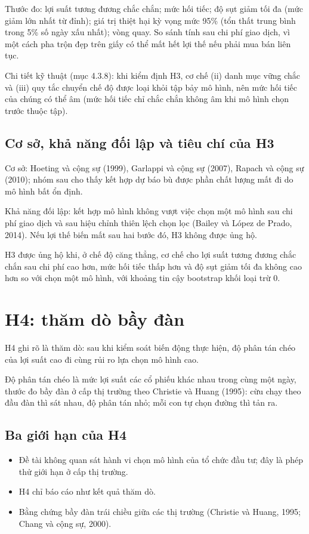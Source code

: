 Thước đo: lợi suất tương đương chắc chắn; mức hối tiếc; độ sụt giảm tối đa (mức giảm lớn nhất từ đỉnh); giá trị thiệt hại kỳ vọng mức 95\% (tổn thất trung bình trong 5\% số ngày xấu nhất); vòng quay. So sánh tính sau chi phí giao dịch, vì một cách pha trộn đẹp trên giấy có thể mất hết lợi thế nếu phải mua bán liên tục.

Chi tiết kỹ thuật (mục 4.3.8): khi kiểm định H3, cơ chế (ii) danh mục vững chắc và (iii) quy tắc chuyển chế độ được loại khỏi tập bảy mô hình, nên mức hối tiếc của chúng có thể âm (mức hối tiếc chỉ chắc chắn không âm khi mô hình chọn trước thuộc tập).

\subsection{Cơ sở, khả năng đối lập và tiêu chí của H3}

Cơ sở: Hoeting và cộng sự (1999), Garlappi và cộng sự (2007), Rapach và cộng sự (2010); nhóm sau cho thấy kết hợp dự báo bù được phần chất lượng mất đi do mô hình bất ổn định.

Khả năng đối lập: kết hợp mô hình không vượt việc chọn một mô hình sau chi phí giao dịch và sau hiệu chỉnh thiên lệch chọn lọc (Bailey và López de Prado, 2014). Nếu lợi thế biến mất sau hai bước đó, H3 không được ủng hộ.

H3 được ủng hộ khi, ở chế độ căng thẳng, cơ chế cho lợi suất tương đương chắc chắn sau chi phí cao hơn, mức hối tiếc thấp hơn và độ sụt giảm tối đa không cao hơn so với chọn một mô hình, với khoảng tin cậy bootstrap khối loại trừ 0.

\section{H4: thăm dò bầy đàn}

H4 ghi rõ là thăm dò: sau khi kiểm soát biến động thực hiện, độ phân tán chéo của lợi suất cao đi cùng rủi ro lựa chọn mô hình cao.

Độ phân tán chéo là mức lợi suất các cổ phiếu khác nhau trong cùng một ngày, thước đo bầy đàn ở cấp thị trường theo Christie và Huang (1995): cừu chạy theo đầu đàn thì sát nhau, độ phân tán nhỏ; mỗi con tự chọn đường thì tản ra.

\subsection{Ba giới hạn của H4}

\begin{itemize}
\item
  Đề tài không quan sát hành vi chọn mô hình của tổ chức đầu tư; đây là phép thử giới hạn ở cấp thị trường.
\item
  H4 chỉ báo cáo như kết quả thăm dò.
\item
  Bằng chứng bầy đàn trái chiều giữa các thị trường (Christie và Huang, 1995; Chang và cộng sự, 2000).
\end{itemize}

